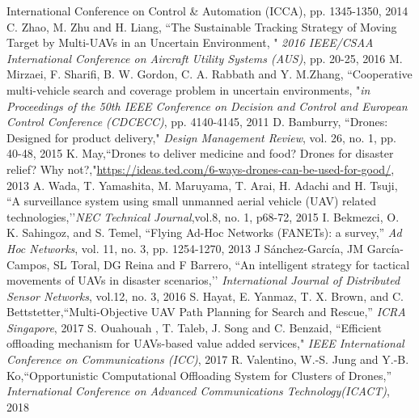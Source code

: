 \documentclass[journal]{IEEEtran}
\begin{document}
\begin{thebibliography}{1}
{International Conference on Control \& Automation (ICCA)}, pp. 1345-1350, 2014 
 C. Zhao, M. Zhu and H. Liang, ``The Sustainable Tracking Strategy of Moving Target by Multi-UAVs in an Uncertain Environment, " \emph{2016 IEEE/CSAA International Conference on Aircraft Utility Systems (AUS)}, pp. 20-25, 2016
 M. Mirzaei, F. Sharifi, B. W. Gordon, C. A. Rabbath and  Y. M.Zhang, ``Cooperative multi-vehicle search and coverage problem in uncertain environments, "\emph{in Proceedings of the 50th IEEE Conference on Decision and Control and European Control Conference (CDCECC)}, pp. 4140-4145, 2011
%
 D. Bamburry, ``Drones: Designed for product delivery," \emph{Design Management Review}, vol. 26, no. 1, pp. 40-48, 2015
K. May,``Drones to deliver medicine and food? Drones for disaster relief? Why not?,"\url{https://ideas.ted.com/6-ways-drones-can-be-used-for-good/}, 2013
A. Wada, T. Yamashita, M. Maruyama, T. Arai, H. Adachi and H. Tsuji, ``A surveillance system using small unmanned aerial vehicle (UAV) related technologies,’’\emph{NEC Technical Journal},vol.8, no. 1, p68-72, 2015
 I. Bekmezci, O. K. Sahingoz, and S. Temel, “Flying Ad-Hoc Networks (FANETs): a survey,” \emph{Ad Hoc Networks}, vol. 11, no. 3, pp. 1254-1270, 2013
 J S\'anchez-Garc\'ia, JM Garc\'ia-Campos, SL Toral, DG Reina and F Barrero, ``An intelligent strategy for tactical movements of UAVs in disaster scenarios,’’\emph{
International Journal of Distributed Sensor Networks}, vol.12, no. 3, 2016
S. Hayat, E. Yanmaz, T. X. Brown, and C. Bettstetter,``Multi-Objective UAV Path Planning for Search and Rescue,” \emph{ICRA Singapore}, 2017 
%
%
S. Ouahouah , T. Taleb, J. Song and C. Benzaid, ``Efficient offloading mechanism for UAVs-based value added services," \emph{IEEE International Conference on Communications (ICC)}, 2017
 R. Valentino, W.-S. Jung and Y.-B. Ko,``Opportunistic Computational Offloading System for Clusters of Drones,” \emph{International Conference on Advanced Communications Technology(ICACT)}, 2018 

\end{thebibliography}
\end{document}
